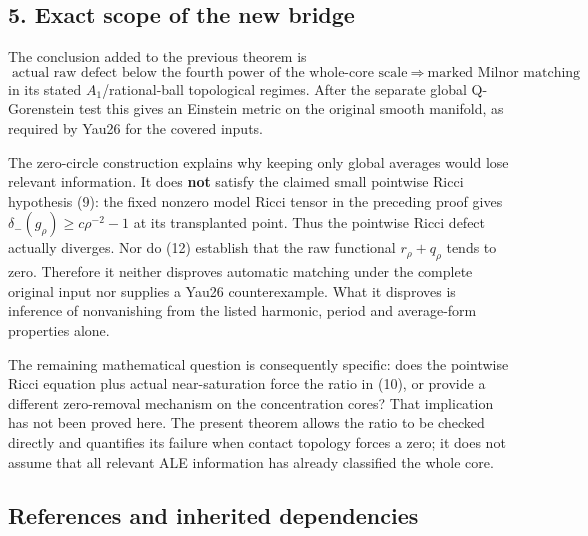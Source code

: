 \documentclass[
  11pt,
]{article}
\begin{document}
\hypertarget{exact-scope-of-the-new-bridge}{%
\subsection{5. Exact scope of the new
bridge}\label{exact-scope-of-the-new-bridge}}

The conclusion added to the previous theorem is \[
 \boxed{\text{actual raw defect below the fourth power of the whole-core
 scale}\ \Longrightarrow\ \text{marked Milnor matching}}
\] in its stated \(A_1\)/rational-ball topological regimes. After the
separate global Q-Gorenstein test this gives an Einstein metric on the
original smooth manifold, as required by Yau26 for the covered inputs.

The zero-circle construction explains why keeping only global averages
would lose relevant information. It does \textbf{not} satisfy the
claimed small pointwise Ricci hypothesis (9): the fixed nonzero model
Ricci tensor in the preceding proof gives
\(\delta_-(g_\rho)\ge c\rho^{-2}-1\) at its transplanted point. Thus the
pointwise Ricci defect actually diverges. Nor do (12) establish that the
raw functional \(r_\rho+q_\rho\) tends to zero. Therefore it neither
disproves automatic matching under the complete original input nor
supplies a Yau26 counterexample. What it disproves is inference of
nonvanishing from the listed harmonic, period and average-form
properties alone.

The remaining mathematical question is consequently specific: does the
pointwise Ricci equation plus actual near-saturation force the ratio in
(10), or provide a different zero-removal mechanism on the concentration
cores? That implication has not been proved here. The present theorem
allows the ratio to be checked directly and quantifies its failure when
contact topology forces a zero; it does not assume that all relevant ALE
information has already classified the whole core.

\hypertarget{references-and-inherited-dependencies}{%
\subsection{References and inherited
dependencies}\label{references-and-inherited-dependencies}}
\end{document}
